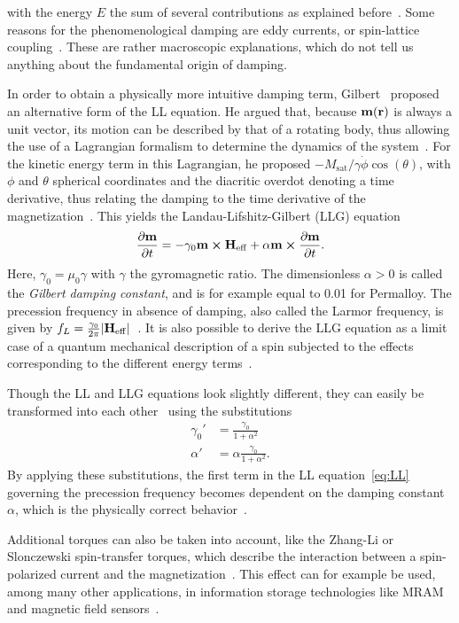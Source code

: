 \documentclass[11pt,a4paper,english,twoside]{article}
\begin{document}
with the energy $E$ the sum of several contributions as explained before~\cite{ThermFluc_SingleDomain}. Some reasons for the phenomenological damping are eddy currents, or spin-lattice coupling~\cite{phd_leliaert}. These are rather macroscopic explanations, which do not tell us anything about the fundamental origin of damping.
\par
In order to obtain a physically more intuitive damping term, Gilbert~\cite{Gilbert1955ALF} proposed an alternative form of the LL equation. He argued that, because $\vb{m}(\vb{r})$ is always a unit vector, its motion can be described by that of a rotating body, thus allowing the use of a Lagrangian formalism to determine the dynamics of the system~\cite{abert2013discrete}. For the kinetic energy term in this Lagrangian, he proposed $-M_\mathrm{sat}/\gamma \dot{\phi} \cos(\theta)$, with $\phi$ and $\theta$ spherical coordinates and the diacritic overdot denoting a time derivative, thus relating the damping to the time derivative of the magnetization~\cite{abert2013discrete}. This yields the Landau-Lifshitz-Gilbert (LLG) equation~\cite{phd_leliaert, ThermFluc_SingleDomain, LEL-17b}
\begin{equation}
    \frac{\partial \vb{m}}{\partial t} = - \gamma_0 \vb{m} \cross \vb{H_\mathrm{eff}} + \alpha \vb{m} \cross \frac{\partial \vb{m}}{\partial t} \mathrm{.}
    \label{eq:LLG}
\end{equation}
Here, $\gamma_0=\mu_0 \gamma$ with $\gamma$ the gyromagnetic ratio. The dimensionless $\alpha > 0$ is called the \textit{Gilbert damping constant}, and is for example equal to 0.01 for Permalloy. The precession frequency in absence of damping, also called the Larmor frequency, is given by  $f_L=\frac{\gamma_0}{2\pi}\abs{\vb{H_\mathrm{eff}}}$~\cite{phd_leliaert}.
It is also possible to derive the LLG equation as a limit case of a quantum mechanical description of a spin subjected to the effects corresponding to the different energy terms~\cite{abert2013discrete,bode2012current}. \par
Though the LL and LLG equations look slightly different, they can easily be transformed into each other~\cite{phd_leliaert,ThermFluc_SingleDomain} using the substitutions
\begin{align*}
    \gamma_0' &= \frac{\gamma_0}{1+\alpha^2} \\
    \alpha' &= \alpha \frac{\gamma_0}{1+\alpha^2} \mathrm{.}
\end{align*}
By applying these substitutions, the first term in the LL equation~\eqref{eq:LL} governing the precession frequency becomes dependent on the damping constant $\alpha$, which is the physically correct behavior~\cite{phd_leliaert}. \par
Additional torques can also be taken into account, like the Zhang-Li or Slonczewski spin-transfer torques, which describe the interaction between a spin-polarized current and the magnetization~\cite{syllabus_PoAEaPD, MuMax3, ZhangLiSpinTransferTorque}. This effect can for example be used, among many other applications, in information storage technologies like MRAM and magnetic field sensors~\cite{syllabus_PoAEaPD}.
\end{document}
